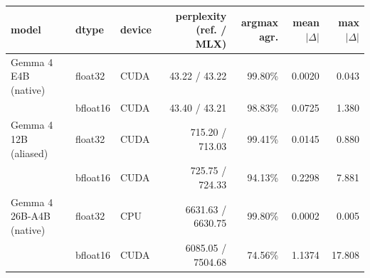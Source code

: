 \begin{tabular}{lllrrrr}
\toprule
model & dtype & device & perplexity (ref. / MLX) & argmax agr. & mean $|\Delta|$ & max $|\Delta|$ \\
\midrule
Gemma 4 E4B (native) & float32 & CUDA & 43.22 / 43.22 & 99.80\% & 0.0020 & 0.043 \\
 & bfloat16 & CUDA & 43.40 / 43.21 & 98.83\% & 0.0725 & 1.380 \\
Gemma 4 12B (aliased) & float32 & CUDA & 715.20 / 713.03 & 99.41\% & 0.0145 & 0.880 \\
 & bfloat16 & CUDA & 725.75 / 724.33 & 94.13\% & 0.2298 & 7.881 \\
Gemma 4 26B-A4B (native) & float32 & CPU & 6631.63 / 6630.75 & 99.80\% & 0.0002 & 0.005 \\
 & bfloat16 & CUDA & 6085.05 / 7504.68 & 74.56\% & 1.1374 & 17.808 \\
\bottomrule
\end{tabular}

